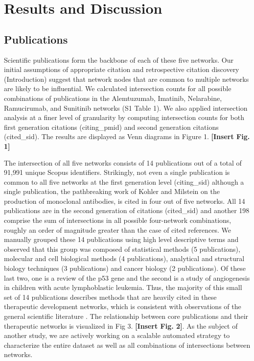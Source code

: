 \documentclass[10pt,letterpaper]{article}
\begin{document}
\section*{Results and Discussion} 

\subsection*{Publications} Scientific publications form the backbone of each of these five networks. Our initial assumptions of appropriate citation and retrospective citation discovery (Introduction) suggest that network nodes that are common to multiple networks are likely to be influential. We calculated intersection counts for all possible combinations of publications in the Alemtuzumab, Imatinib, Nelarabine, Ramucirumab, and Sunitinib networks (S1 Table 1). We also applied intersection analysis at a finer level of granularity by computing intersection counts for both first generation citations (citing\_pmid) and second generation citations (cited\_sid). The results are displayed as Venn diagrams in Figure 1. \textbf{[Insert Fig. 1]}

The intersection of all five networks consists of 14 publications out of a total of 91,991 unique Scopus identifiers. Strikingly, not even a single publication is common to all five networks at the first generation level (citing\_sid) although a single publication, the pathbreaking work of Kohler and Milstein on the production of monoclonal antibodies\cite{bibKohler}, is cited in four out of five networks. All 14 publications are in the second generation of citations (cited\_sid) and another 198 comprise the sum of intersections in all possible four-network combinations, roughly an order of magnitude greater than the case of cited references. We manually grouped these 14 publications using high level descriptive terms and observed that this group was composed of  statistical methods (5 publications), molecular and cell biological methods (4 publications), analytical and structural biology techniques (3 publications) and cancer biology (2 publications). Of these last two, one is a review of the p53 gene\cite{bibLevine} and the second is a study of angiogenesis in children with acute lymphoblastic leukemia\cite{bibFolkman}. Thus, the majority of this small set of 14 publications describes methods that are heavily cited in these therapeutic development networks, which is consistent with observations of the general scientific literature \cite{bibVanNoorden}. The relationship between core publications and their therapeutic networks is visualized in Fig 3. \textbf{[Insert Fig. 2]}. As the subject of another study, we are actively working on a scalable automated strategy to characterize the entire dataset as well as all combinations of intersections between networks. 
\end{document}
